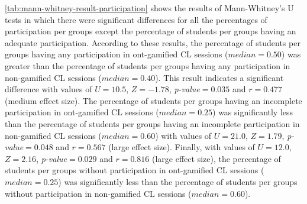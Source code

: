 \autoref{tab:mann-whitney-result-participation} shows the results of Mann-Whitney's U tests in which there were significant differences for all the percentages of participation per groups except the percentage of students per groups having an adequate participation.
According to these results, the percentage of students per groups having any participation in ont-gamified CL sessions ($median = 0.50$) was greater than the percentage of students per groups having any participation in non-gamified CL sessions ($median = 0.40$).
This result indicates a significant difference with values of $U = 10.5$, $Z= -1.78$, \emph{p-value}$ = 0.035$ and $r = 0.477$ (medium effect size).
The percentage of students per groups having an incomplete participation in ont-gamified CL sessions ($median = 0.25$) was significantly less than the percentage of students per groups having an incomplete participation in non-gamified CL sessions ($median = 0.60$) with values of $U = 21.0$, $Z= 1.79$, \emph{p-value}$ = 0.048$ and $r = 0.567$ (large effect size).
Finally, with values of $U = 12.0$, $Z= 2.16$, \emph{p-value}$ = 0.029$ and $r = 0.816$ (large effect size), the percentage of students per groups without participation in ont-gamified CL sessions ($median = 0.25$) was significantly less than the percentage of students per groups without participation in non-gamified CL sessions ($median = 0.60$).


